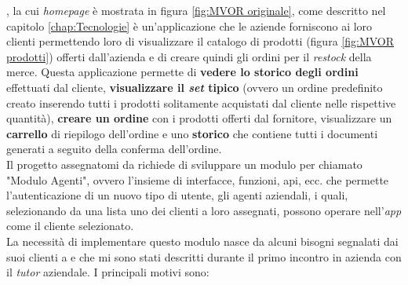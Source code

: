 {\movi}, la cui \textit{homepage} è mostrata in figura \ref{fig:MVOR originale}, come descritto nel capitolo \ref{chap:Tecnologie} 
è un'applicazione che le aziende forniscono ai loro clienti 
permettendo loro di visualizzare il catalogo di prodotti (figura \ref{fig:MVOR prodotti}) offerti dall'azienda e di creare quindi gli ordini per il \textit{restock} 
della merce. Questa applicazione permette di \textbf{vedere lo storico degli ordini} effettuati dal cliente, \textbf{visualizzare il 
\textit{set} tipico} (ovvero un ordine predefinito creato inserendo tutti i prodotti solitamente acquistati dal cliente nelle rispettive quantità), 
\textbf{creare un ordine} con i prodotti offerti dal fornitore, visualizzare un \textbf{carrello} di riepilogo dell'ordine e uno \textbf{storico} che 
contiene tutti i documenti generati a seguito della conferma dell'ordine.\\
Il progetto assegnatomi da {\company} richiede di sviluppare un modulo per {\movi} chiamato "Modulo Agenti", ovvero 
l'insieme di interfacce, funzioni, \gls{api}, ecc. che permette l'autenticazione di un nuovo tipo di utente, gli agenti aziendali, 
i quali, selezionando da una lista uno dei clienti a loro assegnati, possono operare nell'\textit{app} come il cliente selezionato.\\
La necessità di implementare questo modulo nasce da alcuni bisogni segnalati dai suoi clienti a {\company} e che 
mi sono stati descritti durante il primo incontro in azienda con il \textit{tutor} aziendale. I principali motivi sono:

